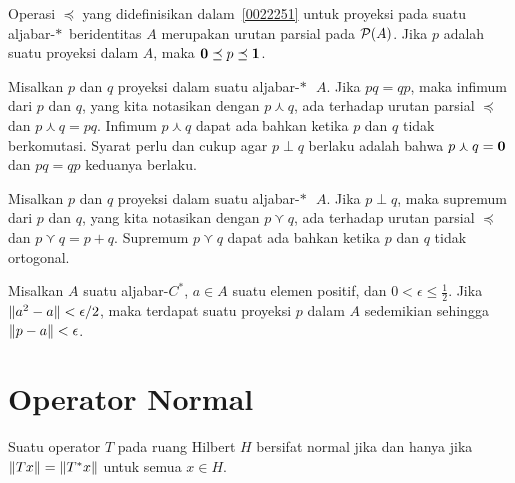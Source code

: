 \begin{prop} Operasi $\preceq$ yang didefinisikan dalam~\ref{0022251} untuk proyeksi pada suatu
aljabar-$*\,$ beridentitas $A$ merupakan urutan parsial pada $\mathcal{P}(A)$. Jika $p$ adalah suatu proyeksi dalam $A$,
maka $\mathbf{0} \preceq p \preceq \mathbf{1}$.
\end{prop}

\begin{prop} Misalkan $p$ dan $q$ proyeksi dalam suatu aljabar-$*\,$~$A$. Jika $pq = qp$, maka
infimum dari $p$ dan $q$, yang kita notasikan
dengan $p \curlywedge q$, ada terhadap urutan parsial $\preceq$ dan $p
\curlywedge q = pq$.  Infimum $p \curlywedge q$ dapat ada bahkan ketika $p$ dan $q$ tidak
berkomutasi.  Syarat perlu dan cukup agar $p \perp q$ berlaku adalah bahwa $p
\curlywedge q = \mathbf{0}$ dan $pq = qp$ keduanya berlaku.
\end{prop}

\begin{prop} Misalkan $p$ dan $q$ proyeksi dalam suatu aljabar-$*\,$~$A$. Jika $p \perp q$, maka
supremum dari $p$ dan $q$, yang kita notasikan
dengan $p \curlyvee q$, ada terhadap urutan parsial $\preceq$ dan $p
\curlyvee q = p + q$.  Supremum $p \curlyvee q$ dapat ada bahkan ketika $p$ dan $q$ tidak
ortogonal.
\end{prop}

\begin{prop} Misalkan $A$ suatu aljabar-$C^*$, $a \in A$ suatu elemen positif, dan $0 < \epsilon \le \frac12$. Jika
$\lVert a^2 - a\rVert < \epsilon/2$, maka terdapat suatu proyeksi $p$ dalam $A$ sedemikian sehingga
$\lVert p - a\rVert < \epsilon$.
\end{prop}
 
 
 
 
 



 
 

\section{Operator Normal}

\begin{prop}\label{prop_nasc_normal} Suatu operator $T$ pada ruang Hilbert $H$ bersifat normal jika dan hanya jika
$\lVert Tx\rVert = \lVert T^*x\rVert$ untuk semua $x \in H$.
\end{prop}

